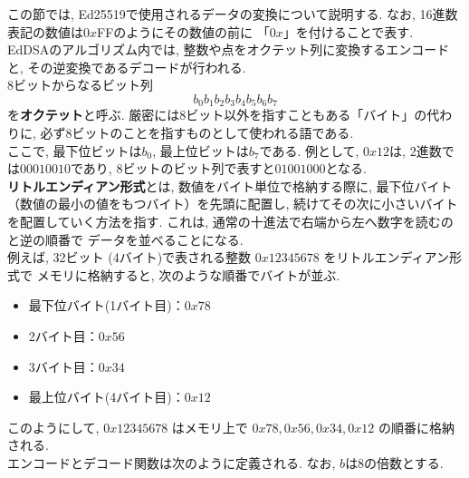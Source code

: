 \indent この節では, Ed25519で使用されるデータの変換について説明する. 
なお, 16進数表記の数値は$0x$FFのようにその数値の前に
「$0x$」を付けることで表す.\\
EdDSAのアルゴリズム内では, 整数や点をオクテット列に変換するエンコードと, 
その逆変換であるデコードが行われる\cite{インフォーズ}.\\
\indent 8ビットからなるビット列
\[
b_0b_1b_2b_3b_4b_5b_6b_7
\]
を\textbf{オクテット}と呼ぶ.
厳密には8ビット以外を指すこともある「バイト」の代わりに, 
必ず8ビットのことを指すものとして使われる語である.\\
ここで, 最下位ビットは$b_0$, 最上位ビットは$b_7$である. 
例として, $0x12$は, 2進数では$00010010$であり, 
8ビットのビット列で表すと$01001000$となる.\\ 
\indent \textbf{リトルエンディアン形式}とは, 数値をバイト単位で格納する際に, 
最下位バイト（数値の最小の値をもつバイト）を先頭に配置し, 
続けてその次に小さいバイトを配置していく方法を指す.
これは, 通常の十進法で右端から左へ数字を読むのと逆の順番で
データを並べることになる.\\
\indent 例えば, 32ビット (4バイト)で表される整数 $0x12345678$ をリトルエンディアン形式で
メモリに格納すると, 次のような順番でバイトが並ぶ. 
\begin{itemize}
  \item 最下位バイト(1バイト目)：$0x78$
  \item 2バイト目：$0x56$
  \item 3バイト目：$0x34$
  \item 最上位バイト(4バイト目)：$0x12$
\end{itemize}
\noindent このようにして, $0x12345678$ はメモリ上で 
$0x78, 0x56, 0x34, 0x12$ の順番に格納される.\\
\indent エンコードとデコード関数は次のように定義される.   
なお, $b$は8の倍数とする. 
